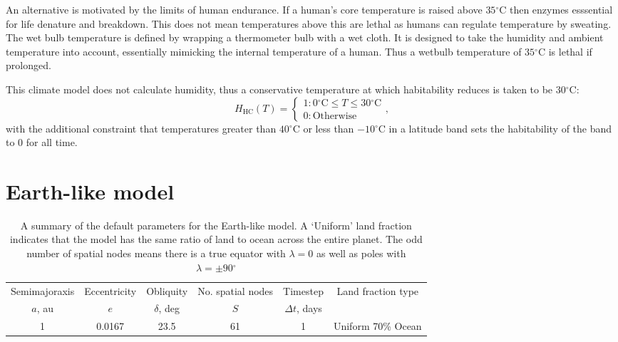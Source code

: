 \documentclass[12pt, onecolumn]{revtex4-2}    %
\newcommand{\degrees}{\ensuremath{^{\circ}}}
\newcommand{\degreesC}{\ensuremath{^{\circ}\text{C}}}
\begin{document}
An alternative is motivated by the limits of human endurance.
If a human's core temperature is raised above $35\degreesC$ then enzymes esssential for life denature and breakdown.
This does not mean temperatures above this are lethal as humans can regulate temperature by sweating.
The wet bulb temperature is defined by wrapping a thermometer bulb with a wet cloth.
It is designed to take the humidity and ambient temperature into account, essentially mimicking the internal temperature of a human.
Thus a wetbulb temperature of $35\degreesC$ is lethal if prolonged.

This climate model does not calculate humidity,
thus a conservative temperature at which habitability reduces is taken to be $30\degreesC$:
\begin{equation}
  H_\text{HC}(T) =
  \begin{cases}
    1 : 0\degreesC \le T \le 30\degreesC \\
    0 : \text{Otherwise}
  \end{cases},
  \label{eq:H_HC}
\end{equation}
with the additional constraint that temperatures greater than $40\degreesC$ or less than $-10\degreesC$ in a latitude band sets the habitability of the band to 0 for all time.

\section{Earth-like model} \label{sec:EarthLikeModel}
\begin{table*}
  \begin{tabular}{|c|c|c|c|c|c|}
    \hline
    Semimajoraxis & Eccentricity & Obliquity     & No. spatial nodes & Timestep         & \multirow{2}{*}{Land fraction type} \\
    $a$, au       & $e$          & $\delta$, deg & $S$               & $\Delta t$, days &                                     \\
    \hline
    1             & 0.0167       & 23.5          & 61                & 1                & Uniform 70\% Ocean                  \\
    \hline
  \end{tabular}
  \caption{A summary of the default parameters for the Earth-like model.
    A `Uniform' land fraction indicates that the model has the same ratio of land to ocean across the entire planet.
    The odd number of spatial nodes means there is a true equator with $\lambda = 0$ as well as poles with $\lambda = \pm 90\degrees$}
  \label{tab:default_params}
\end{table*}
\end{document}
